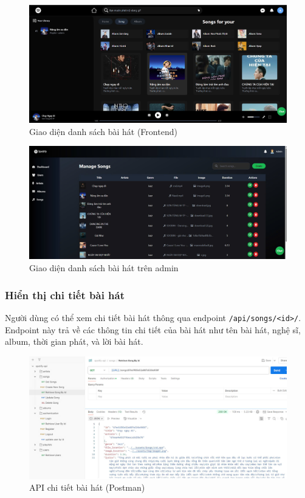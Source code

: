 \begin{figure}[H]
    \centering
    \includegraphics[width=1\textwidth]{imgs/frontend-songs.jpg}
    \caption{Giao diện danh sách bài hát (Frontend)}
\end{figure}
\begin{figure}[H]
    \centering
    \includegraphics[width=1\textwidth]{imgs/frontend-admin-songs.jpg}
    \caption{Giao diện danh sách bài hát trên admin}
\end{figure}

\subsubsection{Hiển thị chi tiết bài hát}
Người dùng có thể xem chi tiết bài hát thông qua endpoint \texttt{/api/songs/<id>/}. Endpoint này trả về các thông tin chi tiết của bài hát như tên bài hát, nghệ sĩ, album, thời gian phát, và lời bài hát.

\begin{figure}[H]
    \centering
    \includegraphics[width=1\textwidth]{imgs/api-song-detail.jpg}
    \caption{API chi tiết bài hát (Postman)}
\end{figure}

